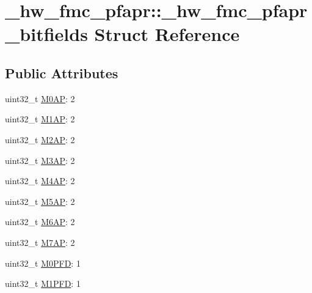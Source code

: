 \hypertarget{struct__hw__fmc__pfapr_1_1__hw__fmc__pfapr__bitfields}{}\section{\+\_\+hw\+\_\+fmc\+\_\+pfapr\+:\+:\+\_\+hw\+\_\+fmc\+\_\+pfapr\+\_\+bitfields Struct Reference}
\label{struct__hw__fmc__pfapr_1_1__hw__fmc__pfapr__bitfields}
\subsection*{Public Attributes}
\begin{DoxyCompactItemize}
\item 
uint32\+\_\+t \hyperlink{struct__hw__fmc__pfapr_1_1__hw__fmc__pfapr__bitfields_add522ca778c968fb0b01a42ff7262841}{M0\+AP}\+: 2
\item 
uint32\+\_\+t \hyperlink{struct__hw__fmc__pfapr_1_1__hw__fmc__pfapr__bitfields_a3f4df4101244883dea3ca9f567271296}{M1\+AP}\+: 2
\item 
uint32\+\_\+t \hyperlink{struct__hw__fmc__pfapr_1_1__hw__fmc__pfapr__bitfields_a1004d0294a7847c1cab8dc2ddfa54eeb}{M2\+AP}\+: 2
\item 
uint32\+\_\+t \hyperlink{struct__hw__fmc__pfapr_1_1__hw__fmc__pfapr__bitfields_aab219e3173a9210e8b038fe70d6b2473}{M3\+AP}\+: 2
\item 
uint32\+\_\+t \hyperlink{struct__hw__fmc__pfapr_1_1__hw__fmc__pfapr__bitfields_af2292570011419cf77610c24fc2216a5}{M4\+AP}\+: 2
\item 
uint32\+\_\+t \hyperlink{struct__hw__fmc__pfapr_1_1__hw__fmc__pfapr__bitfields_a65b178f2ba9b3a09c6e5010ed86e3a88}{M5\+AP}\+: 2
\item 
uint32\+\_\+t \hyperlink{struct__hw__fmc__pfapr_1_1__hw__fmc__pfapr__bitfields_a14aaff7737311ab03f31126ff35cbe52}{M6\+AP}\+: 2
\item 
uint32\+\_\+t \hyperlink{struct__hw__fmc__pfapr_1_1__hw__fmc__pfapr__bitfields_a0f6eef57cc57cf6c4ee6690cf1ad1a29}{M7\+AP}\+: 2
\item 
uint32\+\_\+t \hyperlink{struct__hw__fmc__pfapr_1_1__hw__fmc__pfapr__bitfields_ab86fa475de7e8b1c3a50b39f28896531}{M0\+P\+FD}\+: 1
\item 
uint32\+\_\+t \hyperlink{struct__hw__fmc__pfapr_1_1__hw__fmc__pfapr__bitfields_aa4acbf521f718ddad4e33ff1f3b05cb0}{M1\+P\+FD}\+: 1
\item 

\end{DoxyCompactItemize}
